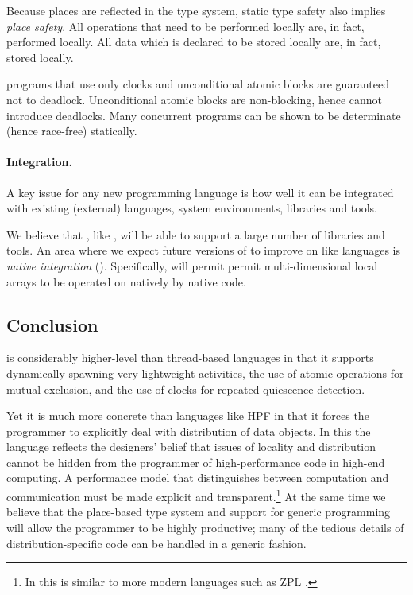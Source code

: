 
Because places are reflected in the type system, static type safety
also implies \emph{place safety}. All operations that need to be performed
locally are, in fact, performed locally.  All data which is declared to be
stored locally are, in fact, stored locally.

\Xten{} programs that use only clocks and unconditional atomic
blocks are guaranteed not to deadlock. Unconditional atomic blocks
are non-blocking, hence cannot introduce deadlocks.
Many concurrent programs can be shown to be determinate (hence
race-free) statically.

\paragraph{Integration.}
A key issue for any new programming language is how well it can be
integrated with existing (external) languages, system environments,
libraries and tools.

We believe that \Xten{}, like \java{}, will be able to support a large
number of libraries and tools. An area where we expect future versions
of \Xten{} to improve on \java{} like languages is \emph{native
integration} (). Specifically, \Xten{} will permit
permit multi-dimensional local arrays to be operated on natively by
native code.

\subsection{Conclusion}
{}\Xten{} is considerably higher-level than thread-based languages in
that it supports dynamically spawning very lightweight activities, the
use of atomic operations for mutual exclusion, and the use of clocks
for repeated quiescence detection.

Yet it is much more concrete than languages like HPF in that it forces
the programmer to explicitly deal with distribution of data
objects. In this the language reflects the designers' belief that
issues of locality and distribution cannot be hidden from the
programmer of high-performance code in high-end computing.  A
performance model that distinguishes between computation and
communication must be made explicit and transparent.\footnote{In this
\Xten{} is similar to more modern languages such as ZPL \cite{zpl}.}
At the same time we believe that the place-based type system and
support for generic programming will allow the \Xten{} programmer to
be highly productive; many of the tedious details of
distribution-specific code can be handled in a generic fashion.

